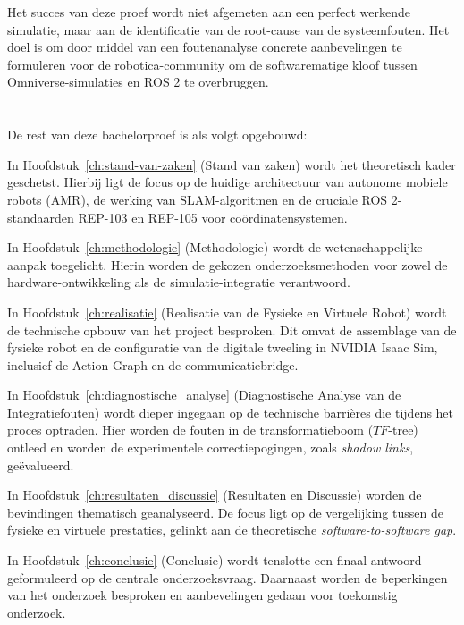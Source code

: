 Het succes van deze proef wordt niet afgemeten aan een perfect werkende simulatie, maar aan de identificatie van de root-cause van de systeemfouten. Het doel is om door middel van een foutenanalyse concrete aanbevelingen te formuleren voor de robotica-community om de softwarematige kloof tussen Omniverse-simulaties en ROS 2 te overbruggen.

\section{}%
\label{sec:opzet-bachelorproef}


De rest van deze bachelorproef is als volgt opgebouwd:

In Hoofdstuk~\ref{ch:stand-van-zaken} (Stand van zaken) wordt het theoretisch kader geschetst. Hierbij ligt de focus op de huidige architectuur van autonome mobiele robots (AMR), de werking van SLAM-algoritmen en de cruciale ROS 2-standaarden REP-103 en REP-105 voor coördinatensystemen.

In Hoofdstuk~\ref{ch:methodologie} (Methodologie) wordt de wetenschappelijke aanpak toegelicht. Hierin worden de gekozen onderzoeksmethoden voor zowel de hardware-ontwikkeling als de simulatie-integratie verantwoord.

In Hoofdstuk~\ref{ch:realisatie} (Realisatie van de Fysieke en Virtuele Robot) wordt de technische opbouw van het project besproken. Dit omvat de assemblage van de fysieke robot en de configuratie van de digitale tweeling in NVIDIA Isaac Sim, inclusief de Action Graph en de communicatiebridge.

In Hoofdstuk~\ref{ch:diagnostische_analyse} (Diagnostische Analyse van de Integratiefouten) wordt dieper ingegaan op de technische barrières die tijdens het proces optraden. Hier worden de fouten in de transformatieboom ($TF$-tree) ontleed en worden de experimentele correctiepogingen, zoals \textit{shadow links}, geëvalueerd.

In Hoofdstuk~\ref{ch:resultaten_discussie} (Resultaten en Discussie) worden de bevindingen thematisch geanalyseerd. De focus ligt op de vergelijking tussen de fysieke en virtuele prestaties, gelinkt aan de theoretische \textit{software-to-software gap}.

In Hoofdstuk~\ref{ch:conclusie} (Conclusie) wordt tenslotte een finaal antwoord geformuleerd op de centrale onderzoeksvraag. Daarnaast worden de beperkingen van het onderzoek besproken en aanbevelingen gedaan voor toekomstig onderzoek.